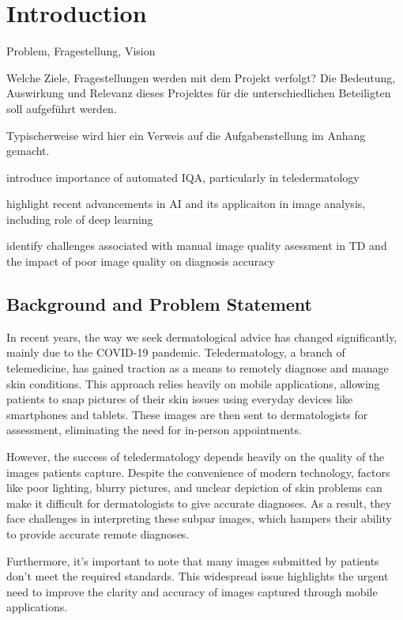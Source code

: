 \chapter{Introduction}
\label{ch:Introduction}
Problem, Fragestellung, Vision

Welche Ziele, Fragestellungen werden mit dem Projekt verfolgt? Die Bedeutung, Auswirkung und Relevanz dieses Projektes für die unterschiedlichen Beteiligten soll aufgeführt werden.

Typischerweise wird hier ein Verweis auf die Aufgabenstellung im Anhang gemacht. \par
\vspace{\baselineskip}
\noindent
introduce importance of automated IQA, particularly in teledermatology \par 
highlight recent advancements in AI and its applicaiton in image analysis, including role of deep learning \par
identify challenges associated with manual image quality asessment in TD and the impact of poor image quality on diagnosis accuracy \par
\par
\vspace{\baselineskip}
\noindent

\section{Background and Problem Statement}
\label{sec:BackgroundProblemStatement}
In recent years, the way we seek dermatological advice has changed significantly, mainly due to the COVID-19 pandemic. Teledermatology, a branch of telemedicine, has gained traction as a means to remotely diagnose and manage skin conditions. This approach relies heavily on mobile applications, allowing patients to snap pictures of their skin issues using everyday devices like smartphones and tablets. These images are then sent to dermatologists for assessment, eliminating the need for in-person appointments. \par
\vspace{\baselineskip}
However, the success of teledermatology depends heavily on the quality of the images patients capture. Despite the convenience of modern technology, factors like poor lighting, blurry pictures, and unclear depiction of skin problems can make it difficult for dermatologists to give accurate diagnoses. As a result, they face challenges in interpreting these subpar images, which hampers their ability to provide accurate remote diagnoses. \par
\vspace{\baselineskip}
Furthermore, it's important to note that many images submitted by patients don't meet the required standards. This widespread issue highlights the urgent need to improve the clarity and accuracy of images captured through mobile applications. \par 

